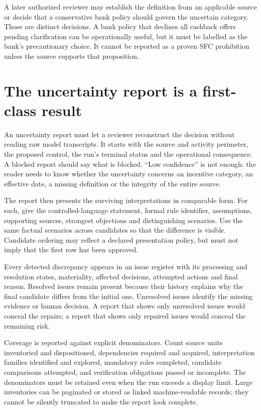 \documentclass[12pt,a4paper,oneside,openany]{book}
\begin{document}
A later authorized reviewer may establish the definition from an applicable
source or decide that a conservative bank policy should govern the uncertain
category. Those are distinct decisions. A bank policy that declines all cashback
offers pending clarification can be operationally useful, but it must be labelled
as the bank's precautionary choice. It cannot be reported as a proven SFC
prohibition unless the source supports that proposition.

\section{The uncertainty report is a first-class result}
\label{merge:M06:22}


An uncertainty report must let a reviewer reconstruct the decision without
reading raw model transcripts. It starts with the source and activity perimeter,
the proposed control, the run's terminal status and the operational consequence.
A blocked report should say what is blocked. ``Low confidence'' is not enough:
the reader needs to know whether the uncertainty concerns an incentive category,
an effective date, a missing definition or the integrity of the entire source.

The report then presents the surviving interpretations in comparable form. For
each, give the controlled-language statement, formal rule identifier, assumptions,
supporting sources, strongest objections and distinguishing scenarios. Use the
same factual scenarios across candidates so that the difference is visible.
Candidate ordering may reflect a declared presentation policy, but must not imply
that the first row has been approved.

Every detected discrepancy appears in an issue register with its processing and
resolution states, materiality, affected decisions, attempted actions and final
reason. Resolved issues remain present because their history explains why the
final candidate differs from the initial one. Unresolved issues identify the
missing evidence or human decision. A report that shows only unresolved issues
would conceal the repairs; a report that shows only repaired issues would conceal
the remaining risk.

Coverage is reported against explicit denominators. Count source units inventoried
and dispositioned, dependencies required and acquired, interpretation families
identified and explored, mandatory roles completed, candidate comparisons
attempted, and verification obligations passed or incomplete. The denominators
must be retained even when the run exceeds a display limit. Large inventories
can be paginated or stored as linked machine-readable records; they cannot be
silently truncated to make the report look complete.
\end{document}
